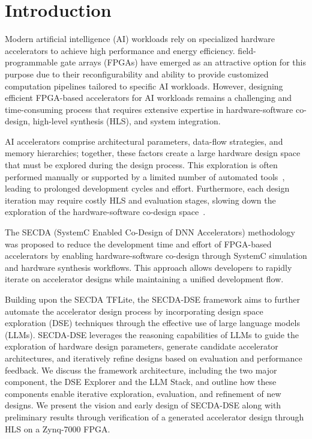 
\section{Introduction}
\label{intro}

Modern artificial intelligence (AI) workloads rely on specialized hardware accelerators to achieve high performance and energy efficiency. 
field-programmable gate arrays (FPGAs) have emerged as an attractive option for this purpose due to their reconfigurability and ability to provide customized computation pipelines tailored to specific AI workloads. 
However, designing efficient FPGA-based accelerators for AI workloads remains a challenging and time-consuming process that requires extensive expertise in hardware-software co-design, high-level synthesis (HLS), and system integration.


AI accelerators comprise architectural parameters, data-flow strategies, and memory hierarchies; together, these factors create a large hardware design space that must be explored during the design process.
This exploration is often performed manually or supported by a limited number of automated tools~\cite{cesaretti2025rapid, tiwari2025hardware}, leading to prolonged development cycles and effort.
Furthermore, each design iteration may require costly HLS and evaluation stages, slowing down the exploration of the hardware-software co-design space~\cite{gibsonDLASConceptualModel2025}.

The SECDA (SystemC Enabled Co-Design of DNN Accelerators) methodology~\cite{haris2021secda} was proposed to reduce the development time and effort of FPGA-based accelerators by enabling hardware-software co-design through SystemC simulation and hardware synthesis workflows. 
This approach allows developers to rapidly iterate on accelerator designs while maintaining a unified development flow.


Building upon the SECDA TFLite, the SECDA-DSE framework aims to further automate the accelerator design process by incorporating design space exploration (DSE) techniques through the effective use of large language models (LLMs).
SECDA-DSE leverages the reasoning capabilities of LLMs to guide the exploration of hardware design parameters, generate candidate accelerator architectures, and iteratively refine designs based on evaluation and performance feedback. 
We discuss the framework architecture, including the two major component, the DSE Explorer and the LLM Stack, and outline how these components enable iterative exploration, evaluation, and refinement of new designs. 
We present the vision and early design of SECDA-DSE along with preliminary results through verification of a generated accelerator design through HLS on a Zynq-7000 FPGA.


